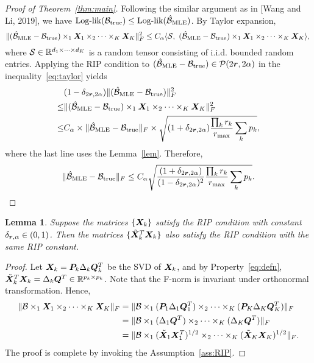 \documentclass[11pt]{article}
\theoremstyle{plain}
\newtheorem{lem}{Lemma}
\theoremstyle{definition}
\begin{document}
\begin{proof}[Proof of Theorem~\ref{thm:main}]
Following the similar argument as in [Wang and Li, 2019], we have $\text{Log-lik}(\mathcal{B}_\text{true})\leq \text{Log-lik}(\hat {\mathcal{B}}_{\text{MLE}})$. By Taylor expansion, 
\begin{equation}\label{eq:taylor}
\lVert(\hat {\mathcal{B}}_{\text{MLE}}-\mathcal{B}_{\text{true}})\times_1 \bm X_1\times_2 \cdots\times_K \bm X_K\rVert_F^2 \leq C_\alpha\langle \mathcal{S},\ (\hat {\mathcal{B}}_{\text{MLE}}-\mathcal{B}_{\text{true}})\times_1 \bm X_1\times_2 \cdots\times_K \bm X_K \rangle ,\\
\end{equation}
where $\mathcal{S}\in\mathbb{R}^{d_1\times \cdots \times d_K}$ is a random tensor consisting of i.i.d. bounded random entries. Applying the RIP condition to $(\hat {\mathcal{B}}_{\text{MLE}}-\mathcal{B}_{\text{true}})\in\mathcal{P}(2\bm{r},2\alpha)$ in the inequality~\eqref{eq:taylor} yields
\begin{align}
&(1-\delta_{2\bm{r},2\alpha})\lVert(\hat {\mathcal{B}}_{\text{MLE}}-\mathcal{B}_{\text{true}})\rVert_F^2\\
\leq &\lVert(\hat {\mathcal{B}}_{\text{MLE}}-\mathcal{B}_{\text{true}})\times_1 \bm X_1\times_2 \cdots\times_K \bm X_K\rVert_F^2\\
\leq & C_\alpha\times \lVert\hat {\mathcal{B}}_{\text{MLE}}-\mathcal{B}_{\text{true}}\rVert_F\times \sqrt{ (1+\delta_{2\bm{r},2\alpha}) {\prod_k r_k\over r_{\max}}\sum_k p_k},
\end{align}
where the last line uses the Lemma~\ref{lem}. Therefore,
\[
\lVert\hat {\mathcal{B}}_{\text{MLE}}-\mathcal{B}_{\text{true}}\rVert_F\leq C_\alpha \sqrt{ {(1+\delta_{2\bm{r},2\alpha})\over(1-\delta_{2\bm{r},2\alpha})^2}  {\prod_k r_k \over r_{\max}} \sum_k p_k}.
\]
\end{proof}


\begin{lem}\label{lemma:RIP}
Suppose the matrices $\{\bm X_k\}$ satisfy the RIP condition with constant $\delta_{\bm{r},\alpha}\in(0,1)$. Then the matrices $\{ \tilde {\bm X}^T_k\bm X_k \}$ also satisfy the RIP condition with the same RIP constant. 
\end{lem}
\begin{proof}
Let $\bm X_k=\bm{P}_k\Delta_k \bm{Q}^T_k$ be the SVD of $\bm X_k$, and by Property~\ref{eq:defn}, $\tilde{\bm X}^T_k\bm X_k=\Delta_k\bm{Q}^T\in\mathbb{R}^{p_k\times p_k}$. Note that the F-norm is invariant under orthonormal transformation. Hence,
\begin{align}
\lVert\mathcal{B}\times_1\bm X_1\times_2\cdots\times_K\bm X_K\rVert_F&=\lVert\mathcal{B}\times_1(\bm{P}_1\Delta_1\bm{Q}^T_1)\times_2\cdots\times_K(\bm{P}_K\Delta_K\bm{Q}^T_K)\rVert_F\\
&=\lVert\mathcal{B}\times_1 (\Delta_1\bm{Q}^T)\times_2\cdots\times_K(\Delta_K\bm{Q}^T)\rVert_F\\
&=\lVert\mathcal{B}\times_1 (\tilde {\bm X}_1\bm X^T_1)^{1/2}\times_2\cdots\times_K (\tilde {\bm X}_K\bm X_K)^{1/2} \rVert_F.
\end{align}
The proof is complete by invoking the Assumption~\ref{ass:RIP}.
\end{proof}
\end{document}
